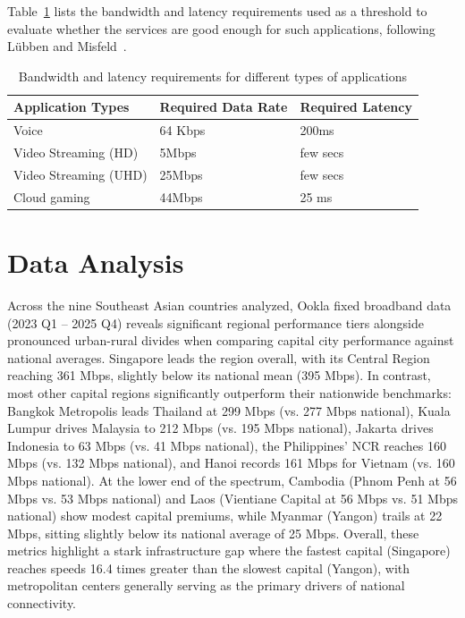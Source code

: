 \documentclass[sigconf,nonacm]{acmart}
\begin{document}
Table~\ref{tab:app-requirements} lists the bandwidth and latency
requirements used as a threshold to evaluate whether the services are good
enough for such applications, following Lübben and Misfeld~\cite{Lubben2022}.

\begin{table}[t]
  \caption{Bandwidth and latency requirements for different types of applications}
  \label{tab:app-requirements}
  \begin{tabular}{lll}
    \toprule
    Application Types & Required Data Rate & Required Latency \\
    \midrule
    Voice                  & 64 Kbps & 200ms \\
    Video Streaming (HD)   & 5Mbps   & few secs \\
    Video Streaming (UHD)  & 25Mbps  & few secs \\
    Cloud gaming           & 44Mbps  & 25 ms \\
    \bottomrule
  \end{tabular}
\end{table}

\section{Data Analysis}
Across the nine Southeast Asian countries analyzed, Ookla fixed broadband
data (2023 Q1 -- 2025 Q4) reveals significant regional performance tiers
alongside pronounced urban-rural divides when comparing capital city
performance against national averages. Singapore leads the region overall,
with its Central Region reaching 361 Mbps, slightly below its national mean
(395 Mbps). In contrast, most other capital regions significantly
outperform their nationwide benchmarks: Bangkok Metropolis leads Thailand
at 299 Mbps (vs. 277 Mbps national), Kuala Lumpur drives Malaysia to
212 Mbps (vs. 195 Mbps national), Jakarta drives Indonesia to 63 Mbps (vs.
41 Mbps national), the Philippines' NCR reaches 160 Mbps (vs. 132 Mbps
national), and Hanoi records 161 Mbps for Vietnam (vs. 160 Mbps national).
At the lower end of the spectrum, Cambodia (Phnom Penh at 56 Mbps vs.
53 Mbps national) and Laos (Vientiane Capital at 56 Mbps vs. 51 Mbps
national) show modest capital premiums, while Myanmar (Yangon) trails at
22 Mbps, sitting slightly below its national average of 25 Mbps. Overall,
these metrics highlight a stark infrastructure gap where the fastest
capital (Singapore) reaches speeds 16.4 times greater than the slowest
capital (Yangon), with metropolitan centers generally serving as the
primary drivers of national connectivity.
\end{document}
